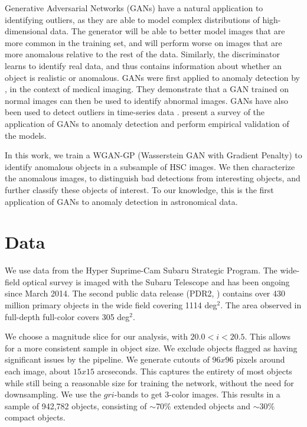 \documentclass{article}
\begin{document}
Generative Adversarial Networks (GANs) have a natural application to identifying outliers, as they are able to model complex distributions of high-dimensional data.
The generator will be able to better model images that are more common in the training set, and will perform worse on images that are more anomalous relative to the rest of the data.
Similarly, the discriminator learns to identify real data, and thus contains information about whether an object is realistic or anomalous. GANs were first applied to anomaly detection by \cite{Schlegl2017}, in the context of medical imaging.
They demonstrate that a GAN trained on normal images can then be used to identify abnormal images.
GANs have also been used to detect outliers in time-series data \citep{Li2018}.
\cite{DiMattia2019} present a survey of the application of GANs to anomaly detection and perform empirical validation of the models.

In this work, we train a WGAN-GP (Wasserstein GAN with Gradient Penalty) to identify anomalous objects in a subsample of HSC images.
We then characterize the anomalous images, to distinguish bad detections from interesting objects, and further classify these objects of interest.
To our knowledge, this is the first application of GANs to anomaly detection in astronomical data.


\section{Data}
\label{data}

We use data from the Hyper Suprime-Cam Subaru Strategic Program.
The wide-field optical survey is imaged with the Subaru Telescope and has been ongoing since March 2014.
The second public data release (PDR2, \citealt{Aihara2014}) contains over 430 million primary objects in the wide field covering 1114 deg$^2$. The area observed in full-depth full-color covers 305 deg$^2$.

We choose a magnitude slice for our analysis, with $20.0<i<20.5$. 
This allows for a more consistent sample in object size. 
We exclude objects flagged as having significant issues by the pipeline. 
We generate cutouts of $96 x 96$ pixels around each image, about $15 x 15$ arcseconds.
This captures the entirety of most objects while still being a reasonable size for training the network, without the need for downsampling.
We use the $gri$-bands to get 3-color images.
This results in a sample of 942,782 objects, consisting of $\sim$70\% extended objects and $\sim$30\% compact objects.
\end{document}
